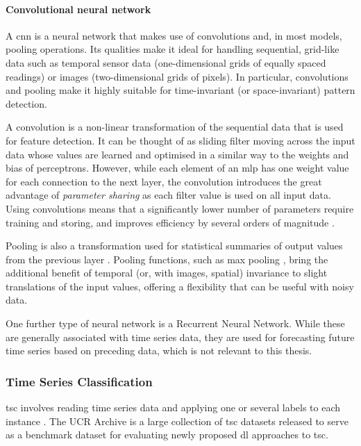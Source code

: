 \paragraph{Convolutional neural network}
A \ac{cnn} is a neural network that makes use of convolutions and, in most models, pooling operations. Its qualities make it ideal for handling sequential, grid-like data such as temporal sensor data (one-dimensional grids of equally spaced readings) or images (two-dimensional grids of pixels). In particular, convolutions and pooling make it highly suitable for time-invariant (or space-invariant) pattern detection. \cite[]{goodfellow_deep_2016}

A convolution is a non-linear transformation of the sequential data that is used for feature detection. It can be thought of as sliding filter moving across the input data whose values are learned and optimised in a similar way to the weights and bias of perceptrons. However, while each element of an \ac{mlp} has one weight value for each connection to the next layer, the convolution introduces the great advantage of \textit{parameter sharing} as each filter value is used on all input data. Using convolutions means that a significantly lower number of parameters require training and storing, and improves efficiency by several orders of magnitude \cite[]{goodfellow_deep_2016}.

Pooling is also a transformation used for statistical summaries of output values from the previous layer \cite[]{goodfellow_deep_2016}. Pooling functions, such as max pooling \cite[]{zhou_computation_1988}, bring the additional benefit of temporal (or, with images, spatial) invariance to slight translations of the input values, offering a flexibility that can be useful with noisy data.

One further type of neural network is a Recurrent Neural Network. While these are generally associated with time series data, they are used for forecasting future time series based on preceding data, which is not relevant to this thesis.

\subsubsection{Time Series Classification}\label{sec:tsc}
\ac{tsc} involves reading time series data and applying one or several labels to each instance \cite{fawaz_inceptiontime_2019}. The UCR Archive \cite{dau_ucr_2019} is a large collection of \ac{tsc} datasets released to serve as a benchmark dataset for evaluating newly proposed \ac{dl} approaches to \ac{tsc}.

